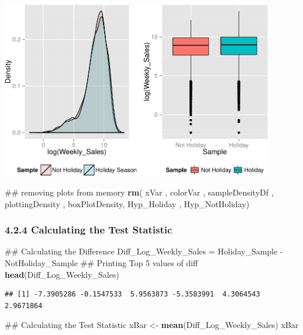\documentclass[]{article}
\newenvironment{Shaded}{\begin{snugshade}}{\end{snugshade}}
\newcommand{\KeywordTok}[1]{\textcolor[rgb]{0.13,0.29,0.53}{\textbf{{#1}}}}
\newcommand{\StringTok}[1]{\textcolor[rgb]{0.31,0.60,0.02}{{#1}}}
\newcommand{\NormalTok}[1]{{#1}}
\begin{document}
\includegraphics[width=450px]{PredictingWeeklySalesAtWalmart_files/figure-latex/visualizingTheSamplesCollected2-1}

\begin{Shaded}
\begin{Highlighting}[]
\NormalTok{## removing plots from memory}
\KeywordTok{rm}\NormalTok{( xVar , colorVar , sampleDensityDf , plottingDensity , }
    \NormalTok{boxPlotDensity, Hyp_Holiday , Hyp_NotHoliday)}
\end{Highlighting}
\end{Shaded}

\subsubsection{4.2.4 Calculating the Test
Statistic}\label{calculating-the-test-statistic-1}

\begin{Shaded}
\begin{Highlighting}[]
\NormalTok{## Calculating the Difference}
\NormalTok{Diff_Log_Weekly_Sales =}\StringTok{ }\NormalTok{Holiday_Sample -}\StringTok{ }\NormalTok{NotHoliday_Sample}
\NormalTok{## Printing Top 5 values of diff}
\KeywordTok{head}\NormalTok{(Diff_Log_Weekly_Sales)}
\end{Highlighting}
\end{Shaded}

\begin{verbatim}
## [1] -7.3905286 -0.1547533  5.9563873 -5.3583991  4.3064543  2.9671864
\end{verbatim}

\begin{Shaded}
\begin{Highlighting}[]
\NormalTok{## Calculating the Test Statistic}
\NormalTok{xBar <-}\StringTok{ }\KeywordTok{mean}\NormalTok{(Diff_Log_Weekly_Sales)}
\NormalTok{xBar}
\end{Highlighting}
\end{Shaded}
\end{document}
